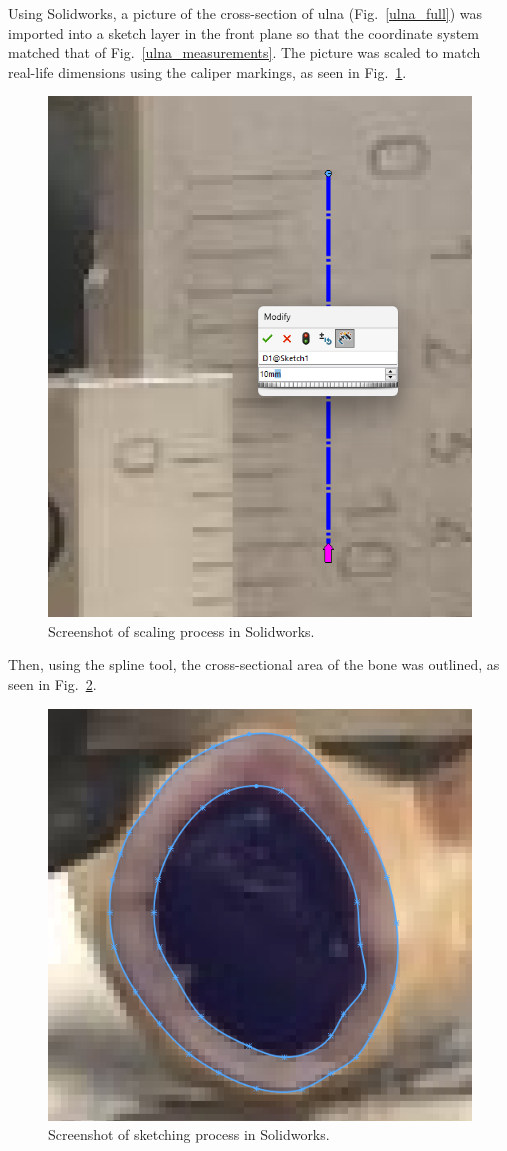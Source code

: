 \documentclass[conference, letterpaper]{IEEEtran}
\begin{document}
            Using Solidworks, a picture of the cross-section of ulna (Fig.~\ref{ulna_full}) was imported into a sketch layer in the front plane so that the coordinate system matched that of Fig.~\ref{ulna_measurements}. The picture was scaled to match real-life dimensions using the caliper markings, as seen in Fig.~\ref{ulna_scale}.
            \begin{figure}[htbp]
                \centerline{\includegraphics[width = 0.75\linewidth]{ulna_scale.png}}
                \caption{Screenshot of scaling process in Solidworks.}\label{ulna_scale}
            \end{figure}

            Then, using the spline tool, the cross-sectional area of the bone was outlined, as seen in Fig.~\ref{ulna_spline}. 
            \begin{figure}[htbp]
                \centerline{\includegraphics[width = 0.75\linewidth]{ulna_spline.png}}
                \caption{Screenshot of sketching process in Solidworks.}\label{ulna_spline}
            \end{figure}
\end{document}
